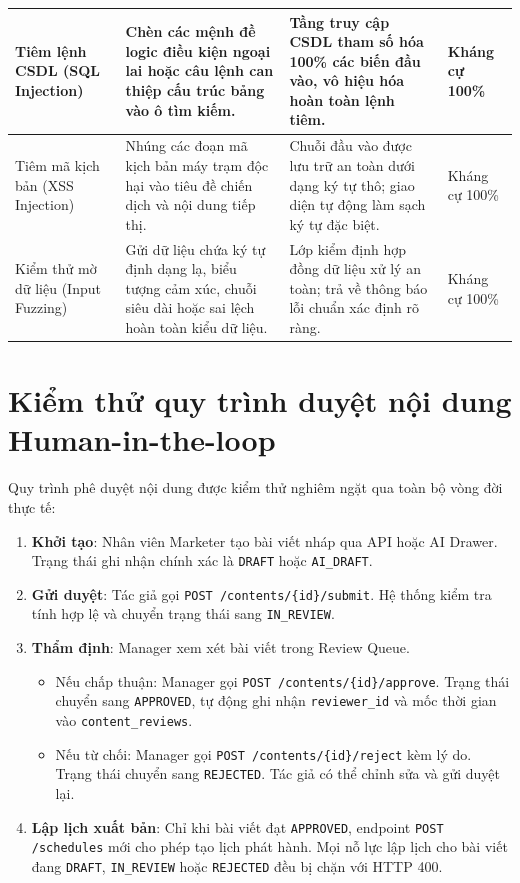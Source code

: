 \begin{table}[H]
\begin{tabularx}{\textwidth}{|L{3.0cm}|Y|L{2.8cm}|C{2.0cm}|}
\hline
Tiêm lệnh CSDL (SQL Injection) & Chèn các mệnh đề logic điều kiện ngoại lai hoặc câu lệnh can thiệp cấu trúc bảng vào ô tìm kiếm. & Tầng truy cập CSDL tham số hóa 100\% các biến đầu vào, vô hiệu hóa hoàn toàn lệnh tiêm. & Kháng cự 100\%\\
\hline
Tiêm mã kịch bản (XSS Injection) & Nhúng các đoạn mã kịch bản máy trạm độc hại vào tiêu đề chiến dịch và nội dung tiếp thị. & Chuỗi đầu vào được lưu trữ an toàn dưới dạng ký tự thô; giao diện tự động làm sạch ký tự đặc biệt. & Kháng cự 100\%\\
\hline
Kiểm thử mờ dữ liệu (Input Fuzzing) & Gửi dữ liệu chứa ký tự định dạng lạ, biểu tượng cảm xúc, chuỗi siêu dài hoặc sai lệch hoàn toàn kiểu dữ liệu. & Lớp kiểm định hợp đồng dữ liệu xử lý an toàn; trả về thông báo lỗi chuẩn xác định rõ ràng. & Kháng cự 100\%\\
\hline
\end{tabularx}
\end{table}

\section{Kiểm thử quy trình duyệt nội dung Human-in-the-loop}

Quy trình phê duyệt nội dung được kiểm thử nghiêm ngặt qua toàn bộ vòng đời thực tế:
\begin{enumerate}
  \item \textbf{Khởi tạo}: Nhân viên Marketer tạo bài viết nháp qua API hoặc AI Drawer. Trạng thái ghi nhận chính xác là \texttt{DRAFT} hoặc \texttt{AI\_DRAFT}.
  \item \textbf{Gửi duyệt}: Tác giả gọi \texttt{POST /contents/\{id\}/submit}. Hệ thống kiểm tra tính hợp lệ và chuyển trạng thái sang \texttt{IN\_REVIEW}.
  \item \textbf{Thẩm định}: Manager xem xét bài viết trong Review Queue.
    \begin{itemize}
      \item Nếu chấp thuận: Manager gọi \texttt{POST /contents/\{id\}/approve}. Trạng thái chuyển sang \texttt{APPROVED}, tự động ghi nhận \texttt{reviewer\_id} và mốc thời gian vào \texttt{content\_reviews}.
      \item Nếu từ chối: Manager gọi \texttt{POST /contents/\{id\}/reject} kèm lý do. Trạng thái chuyển sang \texttt{REJECTED}. Tác giả có thể chỉnh sửa và gửi duyệt lại.
    \end{itemize}
  \item \textbf{Lập lịch xuất bản}: Chỉ khi bài viết đạt \texttt{APPROVED}, endpoint \texttt{POST /schedules} mới cho phép tạo lịch phát hành. Mọi nỗ lực lập lịch cho bài viết đang \texttt{DRAFT}, \texttt{IN\_REVIEW} hoặc \texttt{REJECTED} đều bị chặn với HTTP 400.
\end{enumerate}

